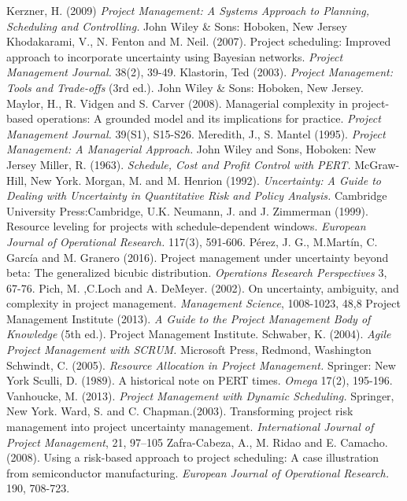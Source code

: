\documentclass[11pt]{article}
\begin{document}
\begin{thebibliography}{10}
  	Kerzner, H.  (2009)  {\em Project Management: A Systems Approach to Planning, Scheduling and Controlling.} John Wiley \& Sons: Hoboken, New Jersey
  	Khodakarami, V., N. Fenton and M. Neil. (2007). Project scheduling: Improved approach to incorporate uncertainty using Bayesian networks. {\em Project Management Journal.} 38(2),  39-49.
  	Klastorin, Ted (2003). {\em Project Management: Tools and Trade-offs} (3rd ed.). John Wiley \& Sons: Hoboken, New Jersey.
  	Maylor, H., R. Vidgen and S. Carver (2008). Managerial complexity in project-based operations: A grounded model and its implications for practice.  {\em Project Management Journal.} 39(S1), S15-S26.
  	Meredith, J., S. Mantel (1995). {\em Project Management: A Managerial Approach.} John Wiley and Sons, Hoboken: New Jersey
  	Miller, R. (1963). {\em Schedule, Cost and Profit Control with PERT.} McGraw-Hill, New
              York.
   Morgan, M. and M. Henrion (1992). {\em Uncertainty: A Guide to Dealing with Uncertainty in
  Quantitative Risk and Policy Analysis.}  Cambridge University Press:Cambridge, U.K.
    Neumann, J. and J. Zimmerman (1999).  Resource leveling for projects with schedule-dependent windows.  {\em European Journal of Operational Research.}  117(3), 591-606.
   Pérez, J. G., M.Martín, C. García and M. Granero (2016). Project management under uncertainty beyond beta: The generalized bicubic distribution. {\em Operations Research Perspectives} 3, 67-76.
   Pich, M. ,C.Loch and A. DeMeyer. (2002). On uncertainty, ambiguity, and
  complexity in project management. {\em Management Science}, 1008-1023, 48,8
   Project Management Institute (2013). {\em A Guide to the Project Management Body of
  Knowledge} (5th ed.). Project Management Institute.
   Schwaber, K.  (2004). {\em Agile Project Management with SCRUM.} Microsoft Press,
           Redmond, Washington
   Schwindt, C. (2005). {\em Resource Allocation in Project Management.} Springer: New York
   Sculli, D. (1989). A historical note on PERT times. {\em Omega} 17(2), 195-196.
   Vanhoucke, M. (2013). {\em Project Management with Dynamic Scheduling.} Springer, New
          York.
   Ward, S. and C. Chapman.(2003). Transforming project risk management into project
          uncertainty management. {\em International Journal of Project Management}, 21, 97–105
   Zafra-Cabeza, A., M. Ridao and E. Camacho. (2008). Using a risk-based approach to
         project scheduling: A case illustration from semiconductor manufacturing. {\em European
        Journal of Operational Research.} 190, 708-723.
  \end{thebibliography}
\end{document}

